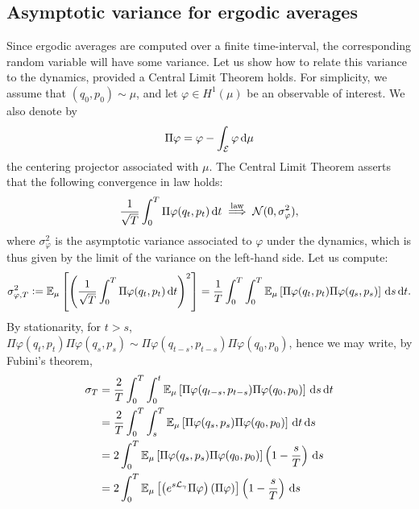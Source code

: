         \subsection{Asymptotic variance for ergodic averages}\label{subsec:asymptotic_variance_cont}
        Since ergodic averages are computed over a finite time-interval, the corresponding random variable will have some variance. 
        Let us show how to relate this variance to the dynamics, provided a Central Limit Theorem holds.
        For simplicity, we assume that $(q_0,p_0)\sim \mu$, and let $\varphi \in H^1(\mu)$ be an observable of interest. We also denote by
        \begin{equation}
            \label{eq:equilibrium_projector}
            \Pi \varphi = \varphi -\int_\mathcal{E}\varphi\,\mathrm{d} \mu
        \end{equation}
        the centering projector associated with $\mu$. The Central Limit Theorem asserts that the following convergence in law holds:
        \begin{equation}
            \label{eq:clt_diffusion}
            \frac1{\sqrt{T}}\int_0^T\Pi\varphi(q_t,p_t)\,\mathrm{d} t \overset{\mathrm{law}}{\implies} \mathcal N(0,\sigma_{\varphi}^2),
        \end{equation}
        where $\sigma_{\varphi}^2$ is the asymptotic variance associated to $\varphi$ under the dynamics, which is thus given by the limit of the variance on the left-hand side. Let us compute:
        \[\sigma_{\varphi,T}^2\mathrel{\mathop:}= \mathbb{E}_\mu\left[\left(\frac1{\sqrt{T}}\int_0^T\Pi\varphi(q_t,p_t)\,\mathrm{d} t\right)^2\right]=\frac1T\int_0^T\int_0^T\mathbb{E}_\mu\left[\Pi\varphi(q_t,p_t)\Pi\varphi(q_s,p_s)\right]\,\mathrm{d} s\,\mathrm{d} t.\]
        By stationarity, for $t>s$, $\Pi\varphi(q_t,p_t)\Pi\varphi(q_s,p_s)\sim \Pi\varphi(q_{t-s},p_{t-s})\Pi\varphi(q_0,p_0)$, hence we may write, by Fubini's theorem, 
        \begin{align*}\sigma_T &= \frac2T\int_0^T\int_0^t\mathbb{E}_\mu\left[\Pi\varphi(q_{t-s},p_{t-s})\Pi\varphi(q_0,p_0)\right]\,\mathrm{d} s\,\mathrm{d} t\\
             &= \frac2T\int_0^T\int_s^T\mathbb{E}_\mu\left[\Pi\varphi(q_{s},p_{s})\Pi\varphi(q_0,p_0)\right]\,\mathrm{d} t\,\mathrm{d} s\\
             &=2\int_0^T\mathbb{E}_\mu\left[\Pi\varphi(q_{s},p_{s})\Pi\varphi(q_0,p_0)\right]\left(1-\frac{s}{T}\right)\,\mathrm{d} s\\
             &=2\int_0^T\mathbb{E}_\mu\left[\left(e^{s\mathcal{L}_\gamma}\Pi\varphi\right)\left(\Pi\varphi\right)\right]\left(1-\frac{s}{T}\right)\,\mathrm{d} s
        \end{align*}
